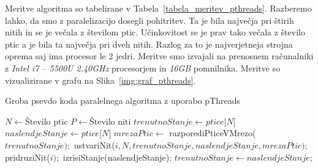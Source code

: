 \documentclass[a4paper, 12pt]{book}
\begin{document}
Meritve algoritma so tabelirane v Tabela~\ref{tabela_meritev_pthreads}. Razberemo lahko, da smo z paralelizacijo dosegli pohitritev. Ta je bila največja pri štirih nitih in se je večala z številom ptic. Učinkovitost se je prav tako večala z število ptic a je bila ta največja pri dveh nitih. Razlog za to je najverjetneja strojna oprema saj ima procesor le 2 jedri. Meritve smo izvajali na prenosnem računalniki z \textit{Intel i7 – 5500U 2.40GHz} procesorjem in \textit{16GB} pomnilnika. Meritve so vizualizirane v grafu na Slika~\ref{img:graf_pthreads}.

\begin{algorithm}
\caption{Groba psevdo koda paralelnega algoritma z uporabo pThreads}\label{paralel_pthreads_pseudo_code}
\begin{algorithmic}[1]
\State $N \gets \text{Število ptic}$
\State $P \gets \text{Število niti}$
\State $trenutnoStanje \gets \textit{ptice[N]}$
\State $naslendjeStanje \gets \textit{ptice[N]}$
\Loop
\State $mrezaPtic \gets$ razporediPticeVMrezo($trenutnoStanje);$
\State ustvariNit($i, N, trenutnoStanje, naslendjeStanje, mrezaPtic);$
\EndFor
{}
\State pridruziNit($i);$
\EndFor
\State izrisiStanje(naslendjeStanje);
\State $trenutnoStanje \gets naslendjeStanje;$
\EndLoop
\end{algorithmic}
\end{algorithm}
\end{document}
